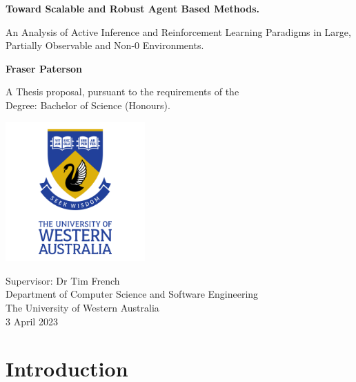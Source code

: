\documentclass[12pt, twoside]{report}
\begin{document}
\begin{titlepage}
	\begin{center}
	
	\vspace*{0.5cm}
	
	\Huge
	\textbf{Toward Scalable and Robust Agent Based Methods.}
	
	\vspace{0.5cm}
	\Large
	An Analysis of Active Inference and Reinforcement Learning Paradigms in Large, Partially Observable and Non-0 Environments.
	
	\vspace{1.5cm}

	\textbf{Fraser Paterson}

	\vspace{1.5cm}

	A Thesis proposal, pursuant to the requirements of the\\ 
	Degree: Bachelor of Science (Honours).  
	
	\vspace{2.0cm}

	\includegraphics[width=0.4\textwidth]{UWA_Logo.png}
	
	\vspace{2.0cm}	
	
	\Large
	Supervisor: Dr Tim French\\ 
	Department of Computer Science and Software Engineering\\
	The University of Western Australia\\
	3 April 2023
	
	\end{center}
\end{titlepage}


\tableofcontents

\cleardoublepage



\section{Introduction}
\end{document}
